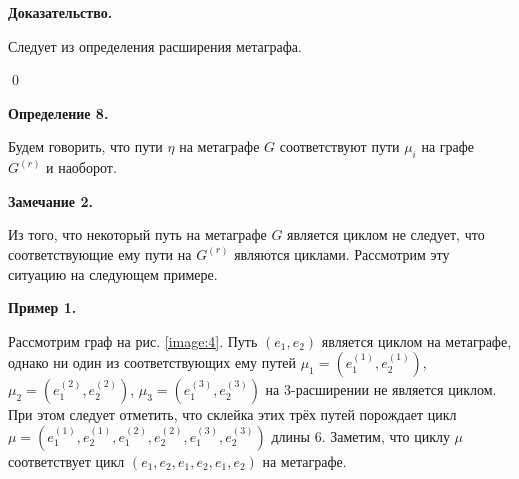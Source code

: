 \documentclass[14pt]{mmcs-article}
\begin{document}
\textbf{Доказательство.}


Следует из определения расширения метаграфа.

\qed

\textbf{Определение 8.}

Будем говорить, что пути $\eta$ на метаграфе $G$ соответствуют пути $\mu_i$ на графе $G^{(r)}$ и наоборот.

\textbf{Замечание 2.}

Из того, что некоторый путь на метаграфе $G$ является циклом не следует, что соответствующие ему пути на $G^{(r)}$ являются циклами. Рассмотрим эту ситуацию на следующем примере.

\textbf{Пример 1.}

Рассмотрим граф на рис. \ref{image:4}. Путь $(e_1, e_2)$ является циклом на метаграфе, однако ни один из соответствующих ему путей $\mu_1 = (e^{(1)}_1, e^{(1)}_2)$, $\mu_2 = (e^{(2)}_1, e^{(2)}_2)$, $\mu_3 = (e^{(3)}_1, e^{(3)}_2)$  на 3-расширении не является циклом. При этом следует отметить, что склейка этих трёх путей порождает цикл $\mu = (e^{(1)}_1, e^{(1)}_2, e^{(2)}_1, e^{(2)}_2, e^{(3)}_1, e^{(3)}_2)$ длины 6. Заметим, что циклу $\mu$ соответствует цикл $(e_1, e_2, e_1, e_2, e_1, e_2)$ на метаграфе.
\end{document}
